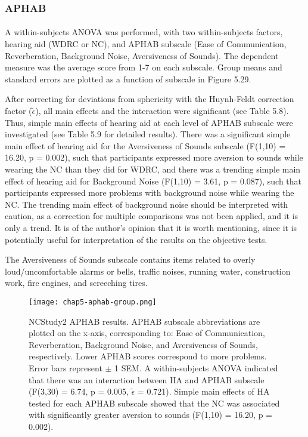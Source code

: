 \subsubsection{APHAB}
\paragraph{}A within-subjects ANOVA was performed, with two within-subjects factors, hearing aid (WDRC or NC), and APHAB subscale (Ease of Communication, Reverberation, Background Noise, Aversiveness of Sounds).  The dependent measure was the average score from 1-7 on each subscale.  Group means and standard errors are plotted as a function of subscale in Figure 5.29.

After correcting for deviations from sphericity with the Huynh-Feldt correction factor ($\tilde{\epsilon}$), all main effects and the interaction were significant (see Table 5.8).  Thus, simple main effects of hearing aid at each level of APHAB subscale were investigated (see Table 5.9 for detailed results).  There was a significant simple main effect of hearing aid for the Aversiveness of Sounds subscale (F(1,10) = 16.20, p = 0.002), such that participants expressed more aversion to sounds while wearing the NC than they did for WDRC, and there was a trending simple main effect of hearing aid for Background Noise (F(1,10) = 3.61, p = 0.087), such that participants expressed more problems with background noise while wearing the NC.  The trending main effect of background noise should be interpreted with caution, as a correction for multiple comparisons was not been applied, and it is only a trend.  It is of the author's opinion that it is worth mentioning, since it is potentially useful for interpretation of the results on the objective tests.

The Aversiveness of Sounds subscale contains items related to overly loud/uncomfortable alarms or bells, traffic noises, running water, construction work, fire engines, and screeching tires.

\begin{figure}[htp]
\begin{center}
\texttt{[image: chap5-aphab-group.png]} \\
\caption[NCStudy2 APHAB results]{NCStudy2 APHAB results.  APHAB subscale abbreviations are plotted on the x-axis, corresponding to: Ease of Communication, Reverberation, Background Noise, and Aversiveness of Sounds, respectively.  Lower APHAB scores correspond to more problems.  Error bars represent $\pm$ 1 SEM.  A within-subjects ANOVA indicated that there was an interaction between HA and APHAB subscale (F(3,30) = 6.74, p = 0.005, $\tilde{\epsilon}$ = 0.721).  Simple main effects of HA tested for each APHAB subscale showed that the NC was associated with significantly greater aversion to sounds (F(1,10) = 16.20, p = 0.002).}
\label{chap5-aphab-group}
\end{center}
\end{figure}

